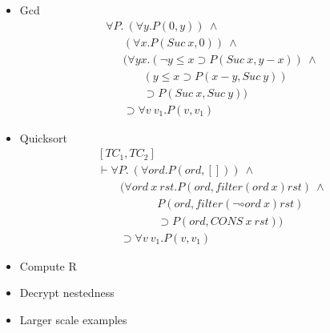 \begin{slide}
\begin{itemize}
\item Gcd
\[
\begin{array}{l}
\forall P.\ (\forall y. P (0,y))\ \land \\
{~~~~~~~}    (\forall x. P (Suc\ x,0))\ \land \\
{~~~~~~~}    (\forall y x. (\neg y \leq x \supset P(Suc\  x,y - x))\ \land \\
{~~~~~~~~~~~~~~~} (y \leq x \supset P(x - y,Suc\ y))\\
{~~~~~~~~~~~~~~~}\supset P (Suc\  x,Suc\ y)) \\
{~~~~~~~}\supset \forall v\ v_1. P (v,v_1)
\end{array}
\]

\item Quicksort
\[
\begin{array}{l}
[TC_1, TC_2] \\
\vdash \forall P.\ (\forall ord. P (ord,[]))\ \land \\
{~~~~~~~~~}(\forall ord\ x\ rst. P (ord,filter (ord\ x) rst)\ \land \\
{~~~~~~~~~~~~~~~~~~~~~~~~}P (ord,filter (\neg \circ ord\ x) rst) \\
{~~~~~~~~~~~~~~~~~~~~~~~~}\supset P(ord,CONS\ x\ rst)) \\
{~~~~~~~~~}\supset \forall v\ v_1. P (v,v_1)
\end{array}
\]
\end{itemize}
\end{slide}


\begin{slide}

\begin{itemize}
\item Compute R
\item Decrypt nestedness
\item Larger scale examples
\end{itemize}
\end{slide}


